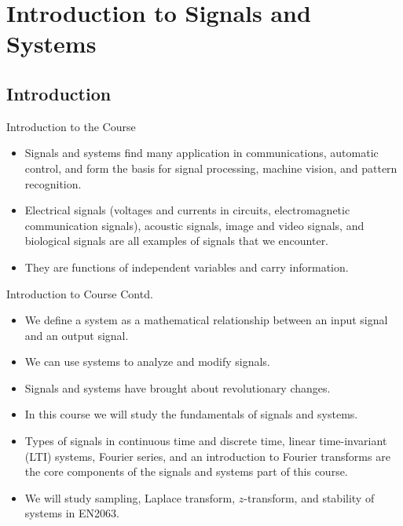 \section{Introduction to Signals and Systems}

\subsection{Introduction}

\begin{frame}{Introduction to the Course}
    \begin{itemize}[<+->]
        \item Signals and systems find many application in communications, automatic control, and form the basis for signal processing, machine vision, and pattern recognition.
        \item Electrical signals (voltages and currents in circuits, electromagnetic communication signals), acoustic signals, image and video signals, and biological signals are all examples of signals that we encounter.
        \item They are functions of independent variables and carry information.
    \end{itemize}
\end{frame}

\begin{frame}{Introduction to Course Contd.}
    \begin{itemize}[<+->]
        \item We define a system as a mathematical relationship between an input signal and an output signal.
        \item We can use systems to analyze and modify signals.
        \item Signals and systems have brought about revolutionary changes.
        \item In this course we will study the fundamentals of signals and systems.
        \item Types of signals in continuous time and discrete time, linear time-invariant (LTI) systems, Fourier series, and an introduction to Fourier transforms are the core components of the signals and systems part of this course.
        \item We will study sampling, Laplace transform, $z$-transform, and stability of systems in EN2063.
    \end{itemize}
\end{frame}





